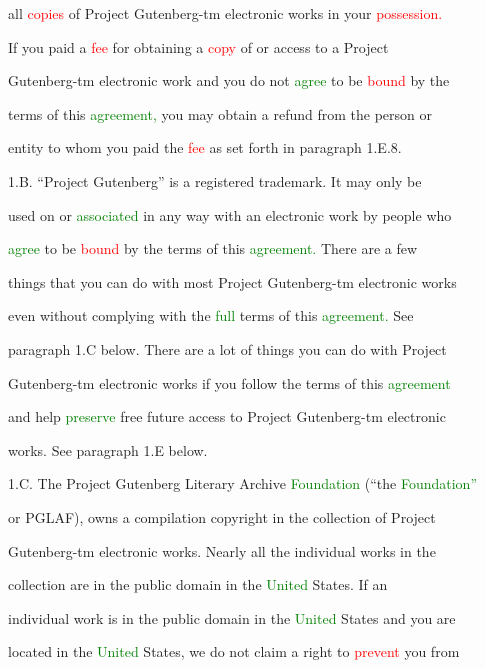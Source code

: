  all \textcolor{red}{copies} of Project Gutenberg-tm electronic works in your \textcolor{red}{possession.}

 If you paid a \textcolor{red}{fee} for obtaining a \textcolor{red}{copy} of or access to a Project

 Gutenberg-tm electronic work and you do not \textcolor{green}{agree} to be \textcolor{red}{bound} by the

 terms of this \textcolor{green}{agreement,} you may obtain a refund from the person or

 entity to whom you paid the \textcolor{red}{fee} as set forth in paragraph 1.E.8.



 1.B. “Project Gutenberg” is a registered trademark. It may only be

 used on or \textcolor{green}{associated} in any way with an electronic work by people who

 \textcolor{green}{agree} to be \textcolor{red}{bound} by the terms of this \textcolor{green}{agreement.} There are a few

 things that you can do with most Project Gutenberg-tm electronic works

 even without complying with the \textcolor{green}{full} terms of this \textcolor{green}{agreement.} See

 paragraph 1.C below. There are a lot of things you can do with Project

 Gutenberg-tm electronic works if you follow the terms of this \textcolor{green}{agreement}

 and help \textcolor{green}{preserve} free future access to Project Gutenberg-tm electronic

 works. See paragraph 1.E below.



 1.C. The Project Gutenberg Literary Archive \textcolor{green}{Foundation} (“the \textcolor{green}{Foundation”}

 or PGLAF), owns a compilation copyright in the collection of Project

 Gutenberg-tm electronic works. Nearly all the individual works in the

 collection are in the \textcolor{BurntOrange}{public} domain in the \textcolor{green}{United} States. If an

 individual work is in the \textcolor{BurntOrange}{public} domain in the \textcolor{green}{United} States and you are

 located in the \textcolor{green}{United} States, we do not claim a right to \textcolor{red}{prevent} you from

